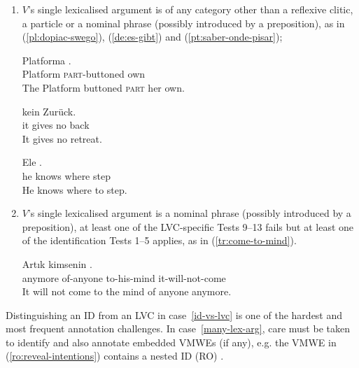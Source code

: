 \documentclass[output=paper,
modfonts,
]{langscibook}
\begin{document}
\begin{enumerate}
\item $V$'s single lexicalised argument is of any category other than a reflexive clitic, a particle or a nominal phrase (possibly introduced by a preposition), as in (\ref{pl:dopiac-swego}), (\ref{de:es-gibt}) and (\ref{pt:saber-onde-pisar});


\ea \label{pl:dopiac-swego}
\settowidth {}
\gll Platforma  . \\
Platform \textsc{part}-buttoned own\\ 
\glt The Platform buttoned \textsc{part} her own. 
\z

\ea \label{de:es-gibt}
\settowidth {}
\gll  {}   kein Zurück.\\
it gives no back\\ 
\glt It gives no retreat. 
\z

\ea \label{pt:saber-onde-pisar}
\settowidth {}
\gll Ele  \underline{} \underline{}. \\
he knows where step\\ 
\glt He knows where to step. 
\z

\item\label{id-vs-lvc} $V$'s single lexicalised argument is a nominal phrase (possibly introduced by a preposition), at least one of the  LVC-specific Tests 9--13 fails but at least one of the identification Tests 1--5 applies, as in (\ref{tr:come-to-mind}).

\ea \label{tr:come-to-mind}
\settowidth {}
\gll Artık kimsenin  .\\
anymore of-anyone to-his-mind it-will-not-come\\ 
\glt It will not come to the mind of anyone anymore. 
\z

\end{enumerate}

Distinguishing an ID from an LVC in case~\ref{id-vs-lvc} is one of the hardest and most frequent annotation challenges.  In case~\ref{many-lex-arg}, care must be taken to identify and also annotate embedded VMWEs (if any), e.g. the VMWE in (\ref{ro:reveal-intentions}) 
contains a nested ID (RO) . 
\end{document}
